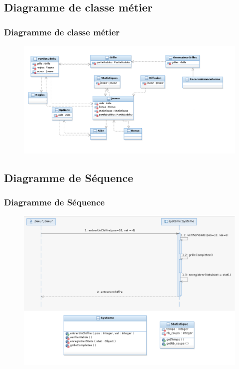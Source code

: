 \documentclass{beamer}
\begin{document}
\subsection{Diagramme de classe métier}
\begin{frame}
  \frametitle{Diagramme de classe métier}
  \begin{figure}[h]
    \includegraphics[scale=0.4]{diagrammeDeClasseMetier.png}
  \end{figure}
\end{frame}

\subsection{Diagramme de Séquence}
\begin{frame}
  \frametitle{Diagramme de Séquence}
  \begin{figure}[h]
    \includegraphics[scale=0.4]{LEdiagrammedesequence.png}
  \end{figure}
\end{frame}
\end{document}
